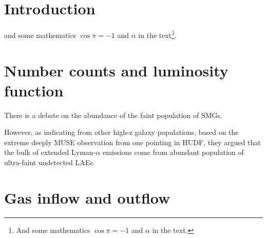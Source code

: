 \documentclass{astronotes/astronotes} %
\affiliation{\textsuperscript{1}\textit{European Sourthern Observatory, Garching, Germany}} %
\affiliation{*\textbf{Email}: cjhastro@gmail.com} %
\begin{document}
\maketitle %

\tableofcontents %

\thispagestyle{empty} %


\section{Introduction} %

\lipsum[1-3] %
 and some mathematics $\cos\pi=-1$ and $\alpha$ in the text\footnote{And some mathematics $\cos\pi=-1$ and $\alpha$ in the text.}.


\section{Number counts and luminosity function}
There is a debate on the abundance of the faint population of SMGs.

However, as indicating from other high-z galaxy populations, \citet{Bacon2021} based on the extreme deeply MUSE observation from one pointing in HUDF, they argued that the bulk of extended Lyman-$\alpha$ emissions come from abundant population of ultra-faint undetected LAEs.




\section{Gas inflow and outflow}
\end{document}
